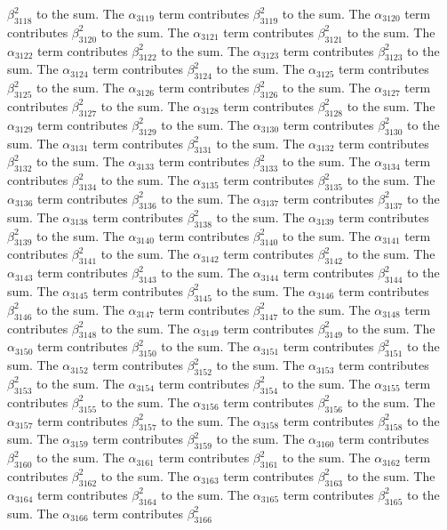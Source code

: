 \begin{lemma}
$\beta_{3118}^{2}$ to the sum. The $\alpha_{3119}$ term contributes $\beta_{3119}^{2}$ to the sum. The $\alpha_{3120}$ term contributes $\beta_{3120}^{2}$ to the sum. The $\alpha_{3121}$ term contributes $\beta_{3121}^{2}$ to the sum. The $\alpha_{3122}$ term contributes $\beta_{3122}^{2}$ to the sum. The $\alpha_{3123}$ term contributes $\beta_{3123}^{2}$ to the sum. The $\alpha_{3124}$ term contributes $\beta_{3124}^{2}$ to the sum. The $\alpha_{3125}$ term contributes $\beta_{3125}^{2}$ to the sum. The $\alpha_{3126}$ term contributes $\beta_{3126}^{2}$ to the sum. The $\alpha_{3127}$ term contributes $\beta_{3127}^{2}$ to the sum. The $\alpha_{3128}$ term contributes $\beta_{3128}^{2}$ to the sum. The $\alpha_{3129}$ term contributes $\beta_{3129}^{2}$ to the sum. The $\alpha_{3130}$ term contributes $\beta_{3130}^{2}$ to the sum. The $\alpha_{3131}$ term contributes $\beta_{3131}^{2}$ to the sum. The $\alpha_{3132}$ term contributes $\beta_{3132}^{2}$ to the sum. The $\alpha_{3133}$ term contributes $\beta_{3133}^{2}$ to the sum. The $\alpha_{3134}$ term contributes $\beta_{3134}^{2}$ to the sum. The $\alpha_{3135}$ term contributes $\beta_{3135}^{2}$ to the sum. The $\alpha_{3136}$ term contributes $\beta_{3136}^{2}$ to the sum. The $\alpha_{3137}$ term contributes $\beta_{3137}^{2}$ to the sum. The $\alpha_{3138}$ term contributes $\beta_{3138}^{2}$ to the sum. The $\alpha_{3139}$ term contributes $\beta_{3139}^{2}$ to the sum. The $\alpha_{3140}$ term contributes $\beta_{3140}^{2}$ to the sum. The $\alpha_{3141}$ term contributes $\beta_{3141}^{2}$ to the sum. The $\alpha_{3142}$ term contributes $\beta_{3142}^{2}$ to the sum. The $\alpha_{3143}$ term contributes $\beta_{3143}^{2}$ to the sum. The $\alpha_{3144}$ term contributes $\beta_{3144}^{2}$ to the sum. The $\alpha_{3145}$ term contributes $\beta_{3145}^{2}$ to the sum. The $\alpha_{3146}$ term contributes $\beta_{3146}^{2}$ to the sum. The $\alpha_{3147}$ term contributes $\beta_{3147}^{2}$ to the sum. The $\alpha_{3148}$ term contributes $\beta_{3148}^{2}$ to the sum. The $\alpha_{3149}$ term contributes $\beta_{3149}^{2}$ to the sum. The $\alpha_{3150}$ term contributes $\beta_{3150}^{2}$ to the sum. The $\alpha_{3151}$ term contributes $\beta_{3151}^{2}$ to the sum. The $\alpha_{3152}$ term contributes $\beta_{3152}^{2}$ to the sum. The $\alpha_{3153}$ term contributes $\beta_{3153}^{2}$ to the sum. The $\alpha_{3154}$ term contributes $\beta_{3154}^{2}$ to the sum. The $\alpha_{3155}$ term contributes $\beta_{3155}^{2}$ to the sum. The $\alpha_{3156}$ term contributes $\beta_{3156}^{2}$ to the sum. The $\alpha_{3157}$ term contributes $\beta_{3157}^{2}$ to the sum. The $\alpha_{3158}$ term contributes $\beta_{3158}^{2}$ to the sum. The $\alpha_{3159}$ term contributes $\beta_{3159}^{2}$ to the sum. The $\alpha_{3160}$ term contributes $\beta_{3160}^{2}$ to the sum. The $\alpha_{3161}$ term contributes $\beta_{3161}^{2}$ to the sum. The $\alpha_{3162}$ term contributes $\beta_{3162}^{2}$ to the sum. The $\alpha_{3163}$ term contributes $\beta_{3163}^{2}$ to the sum. The $\alpha_{3164}$ term contributes $\beta_{3164}^{2}$ to the sum. The $\alpha_{3165}$ term contributes $\beta_{3165}^{2}$ to the sum. The $\alpha_{3166}$ term contributes $\beta_{3166}^{2}$ 
\end{lemma}

